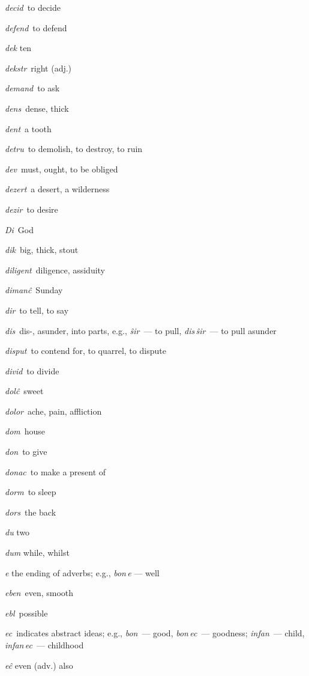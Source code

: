 \begin{landscape}
\begin{multicols}{5}
\begin{outdent}{1em}
\emph{decid\,} to decide

\emph{defend\,} to defend

\emph{dek} ten

\emph{dekstr\,} right (adj.)

\emph{demand\,} to ask

\emph{dens\,} dense, thick

\emph{dent\,} a tooth

\emph{detru\,} to demolish, to destroy, to ruin

\emph{dev\,} must, ought, to be obliged

\emph{dezert\,} a desert, a wilderness

\emph{dezir\,} to desire

\emph{Di\,} God

\emph{dik\,} big, thick, stout

\emph{diligent\,} diligence, assiduity

\emph{dimanĉ\,} Sunday

\emph{dir\,} to tell, to say

\emph{dis\,} dis-, asunder, into parts, e.g., \emph{ŝir\,} — to pull, \emph{dis\,ŝir\,} — to pull asunder

\emph{disput\,} to contend for, to quarrel, to dispute

\emph{divid\,} to divide

\emph{dolĉ\,} sweet

\emph{dolor\,} ache, pain, affliction

\emph{dom\,} house

\emph{don\,} to give

\emph{donac\,} to make a present of

\emph{dorm\,} to sleep

\emph{dors\,} the back

\emph{du} two

\emph{dum} while, whilst
\end{outdent}


\begin{outdent}{1em}
\emph{e} the ending of adverbs; e.g., \emph{bon\,e} — well

\emph{eben\,} even, smooth

\emph{ebl\,} possible

\emph{ec\,} indicates abstract ideas; e.g., \emph{bon\,} — good, \emph{bon\,ec\,} — goodness; \emph{infan\,} — child, \emph{infan\,ec\,} — childhood

\emph{eĉ} even (adv.) also


\end{outdent}
\end{multicols}
\end{landscape}
